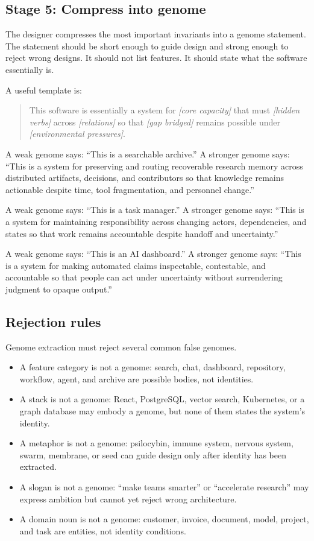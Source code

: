 \documentclass[11pt]{article}
\begin{document}
\subsection{Stage 5: Compress into genome}

The designer compresses the most important invariants into a genome statement. The statement should be short enough to guide design and strong enough to reject wrong designs. It should not list features. It should state what the software essentially is.

A useful template is:

\begin{quote}
This software is essentially a system for \emph{[core capacity]} that must \emph{[hidden verbs]} across \emph{[relations]} so that \emph{[gap bridged]} remains possible under \emph{[environmental pressures]}.
\end{quote}

A weak genome says: ``This is a searchable archive.'' A stronger genome says: ``This is a system for preserving and routing recoverable research memory across distributed artifacts, decisions, and contributors so that knowledge remains actionable despite time, tool fragmentation, and personnel change.''

A weak genome says: ``This is a task manager.'' A stronger genome says: ``This is a system for maintaining responsibility across changing actors, dependencies, and states so that work remains accountable despite handoff and uncertainty.''

A weak genome says: ``This is an AI dashboard.'' A stronger genome says: ``This is a system for making automated claims inspectable, contestable, and accountable so that people can act under uncertainty without surrendering judgment to opaque output.''

\subsection{Rejection rules}

Genome extraction must reject several common false genomes.

\begin{itemize}[leftmargin=*]
    \item A feature category is not a genome: search, chat, dashboard, repository, workflow, agent, and archive are possible bodies, not identities.
    \item A stack is not a genome: React, PostgreSQL, vector search, Kubernetes, or a graph database may embody a genome, but none of them states the system's identity.
    \item A metaphor is not a genome: psilocybin, immune system, nervous system, swarm, membrane, or seed can guide design only after identity has been extracted.
    \item A slogan is not a genome: ``make teams smarter'' or ``accelerate research'' may express ambition but cannot yet reject wrong architecture.
    \item A domain noun is not a genome: customer, invoice, document, model, project, and task are entities, not identity conditions.
\end{itemize}
\end{document}

